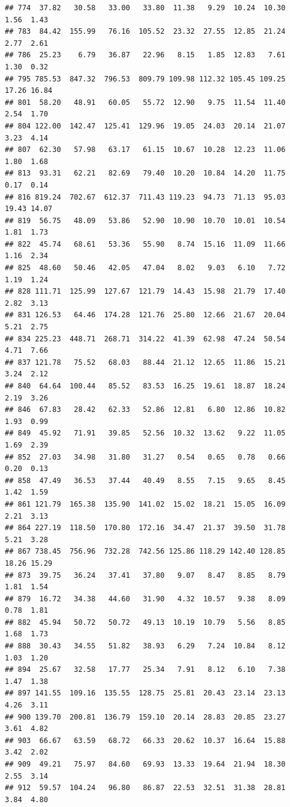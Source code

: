 \documentclass[]{article}
\begin{document}
\begin{verbatim}
## 774  37.82   30.58   33.00   33.80  11.38   9.29  10.24  10.30  1.56  1.43
## 783  84.42  155.99   76.16  105.52  23.32  27.55  12.85  21.24  2.77  2.61
## 786  25.23    6.79   36.87   22.96   8.15   1.85  12.83   7.61  1.30  0.32
## 795 785.53  847.32  796.53  809.79 109.98 112.32 105.45 109.25 17.26 16.84
## 801  58.20   48.91   60.05   55.72  12.90   9.75  11.54  11.40  2.54  1.70
## 804 122.00  142.47  125.41  129.96  19.05  24.03  20.14  21.07  3.23  4.14
## 807  62.30   57.98   63.17   61.15  10.67  10.28  12.23  11.06  1.80  1.68
## 813  93.31   62.21   82.69   79.40  10.20  10.84  14.20  11.75  0.17  0.14
## 816 819.24  702.67  612.37  711.43 119.23  94.73  71.13  95.03 19.43 14.07
## 819  56.75   48.09   53.86   52.90  10.90  10.70  10.01  10.54  1.81  1.73
## 822  45.74   68.61   53.36   55.90   8.74  15.16  11.09  11.66  1.16  2.34
## 825  48.60   50.46   42.05   47.04   8.02   9.03   6.10   7.72  1.19  1.24
## 828 111.71  125.99  127.67  121.79  14.43  15.98  21.79  17.40  2.82  3.13
## 831 126.53   64.46  174.28  121.76  25.80  12.66  21.67  20.04  5.21  2.75
## 834 225.23  448.71  268.71  314.22  41.39  62.98  47.24  50.54  4.71  7.66
## 837 121.78   75.52   68.03   88.44  21.12  12.65  11.86  15.21  3.24  2.12
## 840  64.64  100.44   85.52   83.53  16.25  19.61  18.87  18.24  2.19  3.26
## 846  67.83   28.42   62.33   52.86  12.81   6.80  12.86  10.82  1.93  0.99
## 849  45.92   71.91   39.85   52.56  10.32  13.62   9.22  11.05  1.69  2.39
## 852  27.03   34.98   31.80   31.27   0.54   0.65   0.78   0.66  0.20  0.13
## 858  47.49   36.53   37.44   40.49   8.55   7.15   9.65   8.45  1.42  1.59
## 861 121.79  165.38  135.90  141.02  15.02  18.21  15.05  16.09  2.21  3.13
## 864 227.19  118.50  170.80  172.16  34.47  21.37  39.50  31.78  5.21  3.28
## 867 738.45  756.96  732.28  742.56 125.86 118.29 142.40 128.85 18.26 15.29
## 873  39.75   36.24   37.41   37.80   9.07   8.47   8.85   8.79  1.81  1.54
## 879  16.72   34.38   44.60   31.90   4.32  10.57   9.38   8.09  0.78  1.81
## 882  45.94   50.72   50.72   49.13  10.19  10.79   5.56   8.85  1.68  1.73
## 888  30.43   34.55   51.82   38.93   6.29   7.24  10.84   8.12  1.03  1.20
## 894  25.67   32.58   17.77   25.34   7.91   8.12   6.10   7.38  1.47  1.38
## 897 141.55  109.16  135.55  128.75  25.81  20.43  23.14  23.13  4.26  3.11
## 900 139.70  200.81  136.79  159.10  20.14  28.83  20.85  23.27  3.61  4.82
## 903  66.67   63.59   68.72   66.33  20.62  10.37  16.64  15.88  3.42  2.02
## 909  49.21   75.97   84.60   69.93  13.33  19.64  21.94  18.30  2.55  3.14
## 912  59.57  104.24   96.80   86.87  22.53  32.51  31.38  28.81  3.84  4.80

\end{verbatim}
\end{document}
